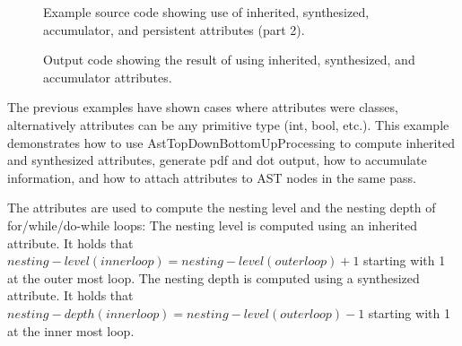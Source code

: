 \begin{latexonly}
\begin{figure}[!h]
{\indent
{\mySmallFontSize

   
}

}\caption{Example source code showing use of inherited, synthesized, accumulator, and persistent attributes (part 2).}
\label{Tutorial:exampleLoopNestingInfoProcessing2}
\end{figure}
\end{latexonly}


\begin{figure}[!h]
{\indent
{\mySmallFontSize

\begin{latexonly}
   
\end{latexonly}

\begin{htmlonly}
   
\end{htmlonly}

}
}
\caption{Output code showing the result of using inherited, synthesized, and accumulator attributes.}
\label{Tutorial:exampleOutput_loopNestingInfoProcessing}
\end{figure}

The previous examples have shown cases where attributes were classes,
alternatively attributes can be any primitive type (int, bool,
etc.). This example demonstrates how to use
AstTopDownBottomUpProcessing to compute inherited and synthesized
attributes, generate pdf and dot output, how to accumulate
information, and how to attach attributes to AST nodes in the same
pass.

The attributes are used to compute the nesting level and the nesting
depth of for/while/do-while loops: The nesting level is computed using
an inherited attribute. It holds that $nesting-level(innerloop) =
nesting-level(outerloop) + 1$ starting with 1 at the outer most loop.
The nesting depth is computed using a synthesized attribute. It holds
that $nesting-depth(innerloop) = nesting-level(outerloop) - 1$
starting with 1 at the inner most loop.

